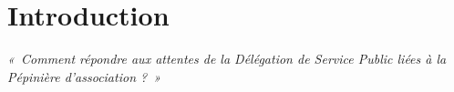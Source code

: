 \section*{Introduction}

\textit{«~Comment répondre aux attentes de la Délégation de Service Public liées à la Pépinière d'association ?~»}